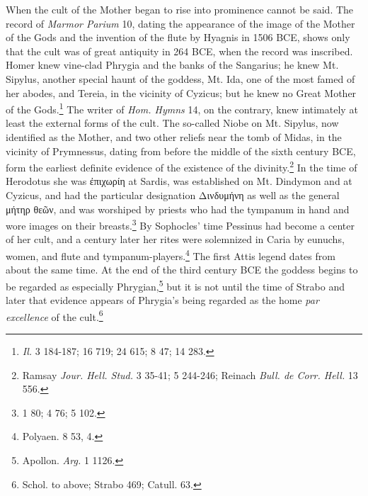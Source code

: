 \documentclass[a4paper, 11pt, oneside, polutonikogreek, english]{article}
\begin{document}
When the cult of the Mother began to rise into prominence cannot be said. The record of \emph{Marmor Parium} 10, dating the appearance of the image of the Mother of the Gods and the invention of the flute by Hyagnis in 1506 \textsc{BCE}, shows only that the cult was of great antiquity in 264 \textsc{BCE}, when the record was inscribed. Homer knew vine-clad Phrygia and the banks of the Sangarius; he knew Mt. Sipylus, another special haunt of the goddess, Mt. Ida, one of the most famed of her abodes, and Tereia, in the vicinity of Cyzicus; but he knew no Great Mother of the Gods.\footnote{\emph{Il.} 3 184-187; 16 719; 24 615; 8 47; 14 283.} The writer of \emph{Hom. Hymns} 14, on the contrary, knew intimately at least the external forms of the cult. The so-called Niobe on Mt. Sipylus, now identified as the Mother, and two other reliefs near the tomb of Midas, in the vicinity of Prymnessus, dating from before the middle of the sixth century \textsc{BCE}, form the earliest definite evidence of the existence of the divinity.\footnote{Ramsay \emph{Jour. Hell. Stud.} 3 35-41; 5 244-246; Reinach \emph{Bull. de Corr. Hell.} 13 556.} In the time of Herodotus she was ἐπιχωρίη at Sardis, was established on Mt. Dindymon and at Cyzicus, and had the particular designation Δινδυμήνη as well as the general μήτηρ θεῶν, and was worshiped by priests who had the tympanum in hand and wore images on their breasts.\footnote{1 80; 4 76; 5 102.} By Sophocles' time Pessinus had become a center of her cult, and a century later her rites were solemnized in Caria by eunuchs, women, and flute and tympanum-players.\footnote{Polyaen. 8 53, 4.} The first Attis legend dates from about the same time. At the end of the third century \textsc{BCE} the goddess begins to be regarded as especially Phrygian,\footnote{Apollon. \emph{Arg.} 1 1126.} but it is not until the time of Strabo and later that evidence appears of Phrygia's being regarded as the home \emph{par excellence} of the cult.\footnote{Schol. to above; Strabo 469; Catull. 63.}
\end{document}
